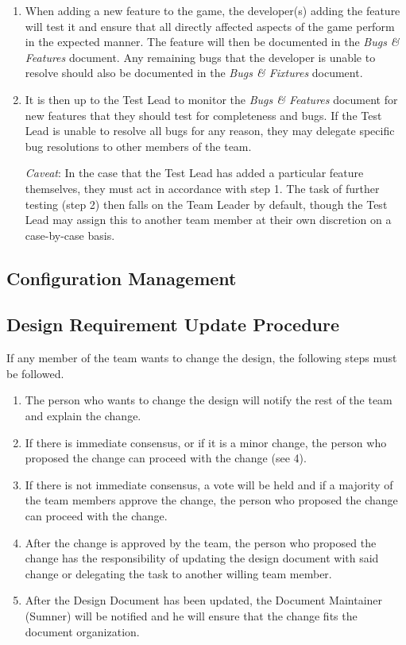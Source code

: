 \documentclass[12pt,titlepage]{article}
\begin{document}
\begin{enumerate}
\item When adding a new feature to the game, the developer(s) adding the feature
      will test it and ensure that all directly affected aspects of the game
      perform in the expected manner. The feature will then be documented in the
      {\it Bugs \& Features} document. Any remaining bugs that the developer is
      unable to resolve should also be documented in the {\it Bugs \& Fixtures}
      document.
\item It is then up to the Test Lead to monitor the {\it Bugs \& Features}
      document for new features that they should test for completeness and bugs.
      If the Test Lead is unable to resolve all bugs for any reason, they may
      delegate specific bug resolutions to other members of the team.

      {\it Caveat}: In the case that the Test Lead has added a particular
      feature themselves, they must act in accordance with step 1. The task of
      further testing (step 2) then falls on the Team Leader by default, though
      the Test Lead may assign this to another team member at their own
      discretion on a case-by-case basis.
\end{enumerate}

\subsection{Configuration Management}

\subsection{Design Requirement Update Procedure}

If any member of the team wants to change the design, the following steps must
be followed.

\begin{enumerate}
    \item The person who wants to change the design will notify the rest of the
        team and explain the change.

    \item If there is immediate consensus, or if it is a minor change, the
        person who proposed the change can proceed with the change (see 4).

    \item If there is not immediate consensus, a vote will be held and if a
        majority of the team members approve the change, the person who proposed
        the change can proceed with the change.

    \item After the change is approved by the team, the person who proposed the
        change has the responsibility of updating the design document with said
        change or delegating the task to another willing team member.

    \item After the Design Document has been updated, the Document Maintainer
        (Sumner) will be notified and he will ensure that the change fits the
        document organization.
\end{enumerate}
\end{document}
